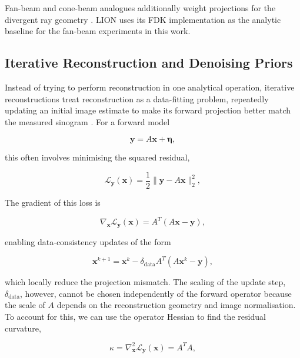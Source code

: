 Fan-beam and cone-beam analogues additionally weight projections for the divergent ray geometry \cite{}. LION uses its FDK implementation as the analytic baseline for the fan-beam experiments in this work.
\subsection{Iterative Reconstruction and Denoising Priors}
\label{subsec:iterative_reconstruction_denoising_priors}

Instead of trying to perform reconstruction in one analytical operation, iterative reconstructions treat reconstruction as a data-fitting problem, repeatedly updating an initial image estimate to make its forward projection better match the measured sinogram \cite{}. For a forward model

\begin{equation}
\mathbf{y}=A\mathbf{x}+\boldsymbol{\eta},
\label{eq:iterative_forward_model}
\end{equation}

this often involves minimising the squared residual,

\begin{equation}
\mathcal{L}_{\mathbf{y}}(\mathbf{x})
=
\frac{1}{2}
\|\mathbf{y}-A\mathbf{x}\|_2^2,
\label{eq:data_loss}
\end{equation}

The gradient of this loss is

\begin{equation}
\nabla_{\mathbf{x}}\mathcal{L}_{\mathbf{y}}(\mathbf{x})
=
A^T(A\mathbf{x}-\mathbf{y}),
\label{eq:data_loss_gradient}
\end{equation}

enabling data-consistency updates of the form

\begin{equation}
\mathbf{x}^{k+1}
=
\mathbf{x}^k
-
\delta_{\mathrm{data}}
A^T(A\mathbf{x}^k-\mathbf{y}),
\label{eq:data_consistency_update}
\end{equation}

which locally reduce the projection mismatch. The scaling of the update step, $\delta_\text{data}$, however, cannot be chosen independently of the forward operator because the scale of $A$ depends on the reconstruction geometry and image normalisation. To account for this, we can use the operator Hessian to find the residual curvature,

\begin{equation}
\kappa=\nabla_{\mathbf{x}}^2\mathcal{L}_{\mathbf{y}}(\mathbf{x})
=
A^TA,
\label{eq:data_loss_hessian}
\end{equation}

